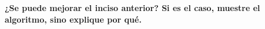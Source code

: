 \textbf{¿Se puede mejorar el inciso anterior? Si es el caso, muestre el algoritmo, sino explique por qué.}\vspace{.2cm}

\textcolor{bibi}{}
\begin{quote}
\end{quote}